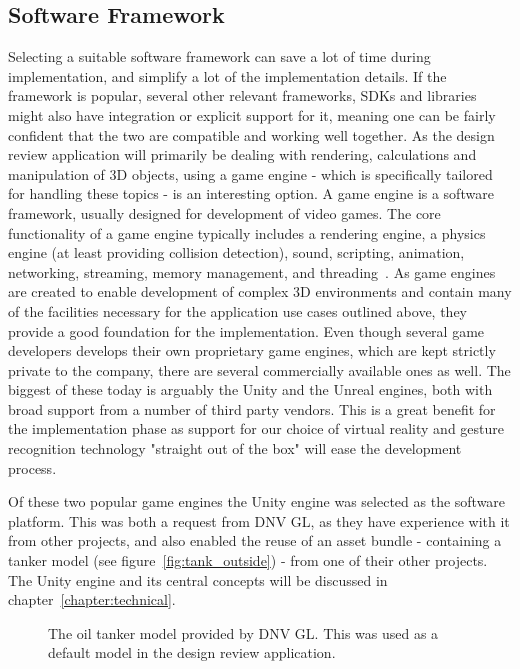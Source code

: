 \subsection{Software Framework}
Selecting a suitable software framework can save a lot of time during implementation, and simplify a lot of the implementation details. 
If the framework is popular, several other relevant frameworks, SDKs and libraries might also have integration or explicit support for it, 
meaning one can be fairly confident that the two are compatible and working well together. 
As the design review application will primarily be dealing with rendering, calculations and manipulation of 3D objects, using a game engine - which is specifically tailored for handling
these topics - is an interesting option.
A game engine is a software framework, usually designed for development of video games. 
The core functionality of a game engine typically includes a rendering engine, a physics engine (at least providing collision detection), sound, scripting, 
animation, networking, streaming, memory management, and threading~\citep{Gregory2014}. As game engines are created to enable development of complex 
3D environments and contain many of the facilities necessary for the application use cases outlined above, they provide a good foundation for the implementation.
Even though several game developers develops their own proprietary game engines, which are kept strictly private to the company, there are several commercially available ones 
as well. The biggest of these today is arguably the Unity and the Unreal engines, both with broad support from a number of third party vendors. 
This is a great benefit for the implementation phase as support for our choice of virtual reality and gesture recognition technology "straight out of the box" 
will ease the development process.

Of these two popular game engines the Unity engine was selected as the software platform. This was both a request from DNV GL, 
as they have experience with it from other projects, and also enabled the reuse of an asset bundle - containing a tanker model (see figure~\vref{fig:tank_outside}) 
- from one of their other projects.
The Unity engine and its central concepts will be discussed in chapter~\vref{chapter:technical}.

\begin{figure}%
	\caption[The oil tanker model provided by DNV GL.]{The oil tanker model provided by DNV GL. This was used as a default model in the design review application.}
	\label{fig:tank_outside}
\end{figure} 


